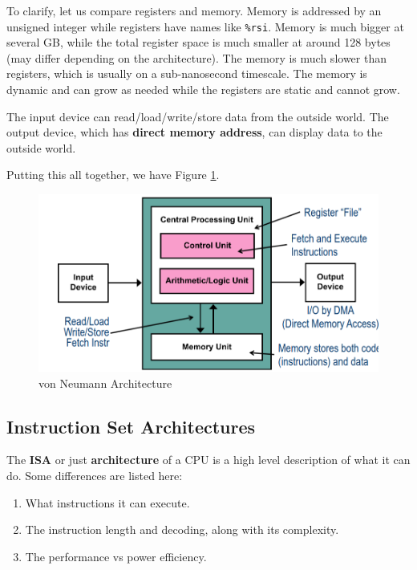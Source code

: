 \documentclass{article}
\begin{document}
    To clarify, let us compare registers and memory. Memory is addressed by an unsigned integer while registers have names like \texttt{\%rsi}. Memory is much bigger at several GB, while the total register space is much smaller at around 128 bytes (may differ depending on the architecture). The memory is much slower than registers, which is usually on a sub-nanosecond timescale. The memory is dynamic and can grow as needed while the registers are static and cannot grow.


    \begin{definition}
      The input device can read/load/write/store data from the outside world. The output device, which has \textbf{direct memory address}, can display data to the outside world. 
    \end{definition}

    Putting this all together, we have Figure \ref{fig:von_neumann_arch}. 

    \begin{figure}[hbt!]
      \centering 
      \includegraphics[scale=0.4]{img/von_neumann_arch.png}
      \caption{von Neumann Architecture} 
      \label{fig:von_neumann_arch}
    \end{figure}

  \subsection{Instruction Set Architectures} 

    \begin{definition}
      The \textbf{ISA} or just \textbf{architecture} of a CPU is a high level description of what it can do. Some differences are listed here: 
      \begin{enumerate} 
        \item What instructions it can execute. 
        \item The instruction length and decoding, along with its complexity. 
        \item The performance vs power efficiency. 
      \end{enumerate}
    \end{definition}
\end{document}
